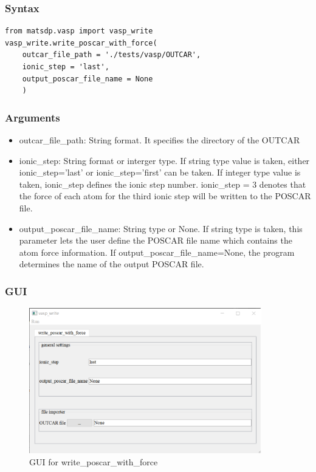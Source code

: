 \documentclass[12pt]{book}
\begin{document}
\subsubsection{Syntax}
\begin{lstlisting}
from matsdp.vasp import vasp_write
vasp_write.write_poscar_with_force(
    outcar_file_path = './tests/vasp/OUTCAR',
    ionic_step = 'last',
    output_poscar_file_name = None
    )
\end{lstlisting}

\subsubsection{Arguments}

\begin{itemize}
\item outcar\_file\_path: String format. It specifies the directory of the OUTCAR
\item ionic\_step: String format or interger type. If string type value is taken, either ionic\_step='last' or ionic\_step='first' can be taken. If integer type value is taken, ionic\_step defines the ionic step number. ionic\_step = 3 denotes that the force of each atom for the third ionic step will be written to the POSCAR file.
\item output\_poscar\_file\_name: String type or None. If string type is taken, this parameter lets the user define the POSCAR file name which contains the atom force information. If output\_poscar\_file\_name=None, the program determines the name of the output POSCAR file. 
\end{itemize}

\subsubsection{GUI}

\begin{figure}[htbp]
\centering
\includegraphics[width=0.9\textwidth]{gui_write_poscar_with_force.pdf}
\caption{GUI for write\_poscar\_with\_force}
\label{fig:GUI_write_poscar_with_force}
\end{figure}
\end{document}
